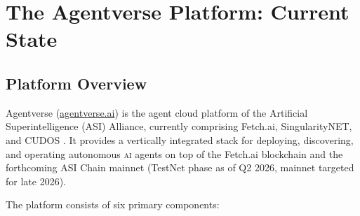 \documentclass[twoside,11pt]{article}
\begin{document}
\section{The Agentverse Platform: Current State}
\label{sec:platform}

\subsection{Platform Overview}
\label{subsec:platform-overview}

Agentverse (\url{agentverse.ai}) is the agent cloud platform of the
Artificial Superintelligence (ASI) Alliance, currently comprising Fetch.ai,
SingularityNET, and CUDOS \citep{asichain2026}.  It provides a vertically
integrated stack for deploying, discovering, and operating autonomous \textsc{ai}
agents on top of the Fetch.ai blockchain and the forthcoming ASI Chain mainnet
(TestNet phase as of Q2 2026, mainnet targeted for late 2026).

The platform consists of six primary components:
\end{document}
